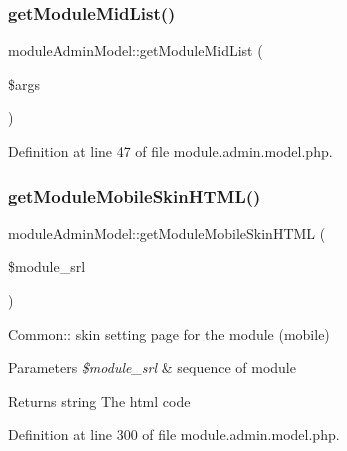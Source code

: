 \hypertarget{classmoduleAdminModel_af1e58f7c102a8ee238f25ff2b193e6d7}{}\label{classmoduleAdminModel_af1e58f7c102a8ee238f25ff2b193e6d7} 
\subsubsection{\texorpdfstring{get\+Module\+Mid\+List()}{getModuleMidList()}}
{\footnotesize\ttfamily module\+Admin\+Model\+::get\+Module\+Mid\+List (\begin{DoxyParamCaption}\item[{}]{\$args }\end{DoxyParamCaption})}



Definition at line 47 of file module.\+admin.\+model.\+php.

\hypertarget{classmoduleAdminModel_a38c85d9c28facff15f1c54ebe1e5b70b}{}\label{classmoduleAdminModel_a38c85d9c28facff15f1c54ebe1e5b70b} 
\subsubsection{\texorpdfstring{get\+Module\+Mobile\+Skin\+H\+T\+M\+L()}{getModuleMobileSkinHTML()}}
{\footnotesize\ttfamily module\+Admin\+Model\+::get\+Module\+Mobile\+Skin\+H\+T\+ML (\begin{DoxyParamCaption}\item[{}]{\$module\+\_\+srl }\end{DoxyParamCaption})}

Common\+:\+: skin setting page for the module (mobile)


\begin{DoxyParams}{Parameters}
{\em \$module\+\_\+srl} & sequence of module \\
\hline
\end{DoxyParams}
\begin{DoxyReturn}{Returns}
string The html code 
\end{DoxyReturn}


Definition at line 300 of file module.\+admin.\+model.\+php.

